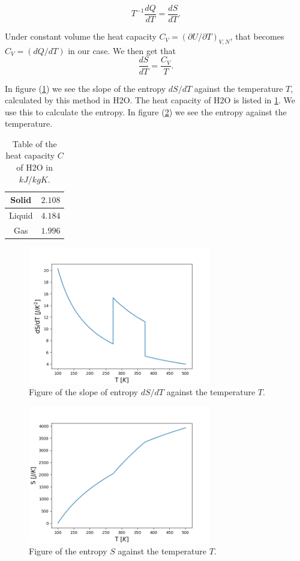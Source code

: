 \documentclass[reprint,english,notitlepage]{revtex4-1}  %
\begin{document}
$$ T^{-1}\frac{dQ}{dT}=\frac{dS}{dT}.$$

Under constant volume the heat capacity $C_V=(\partial U/\partial T)_{V,N}$, that becomes $C_V=(dQ/dT)$ in our case. We then get that 
\begin{equation}\label{}
\frac{dS}{dT}=\frac{C_V}{T}.
\end{equation}


In figure (\ref{fig:dSdT_mot_T}) we see the slope of the entropy $dS/dT$ against the temperature $T$, calculated by this method in H2O. The heat capacity of H2O is listed in \ref{table:h2o}. We use this to calculate the entropy. In figure (\ref{fig:S_mot_T}) we see the entropy against the temperature.

\begin{table}[h]  %
\caption{Table of the heat capacity $C$ of H2O in $kJ/kgK$.}\label{table:h2o}
\begin{tabular}{|c|c|} %
\hline                    %
Solid & $2.108$  \\
\hline
Liquid & $4.184$ \\
\hline
Gas & $1.996$ \\
\hline
\end{tabular}
\end{table}


\begin{figure}
\centering
\includegraphics[width=8cm]{../figures/dSdT_mot_T.png}
\caption{Figure of the slope of entropy $dS/dT$ against the temperature $T$.}
\label{fig:dSdT_mot_T}
\end{figure}

\begin{figure}
\centering
\includegraphics[width=8cm]{../figures/S_mot_T.png}
\caption{Figure of the entropy $S$ against the temperature $T$.}
\label{fig:S_mot_T}
\end{figure}
\end{document}
